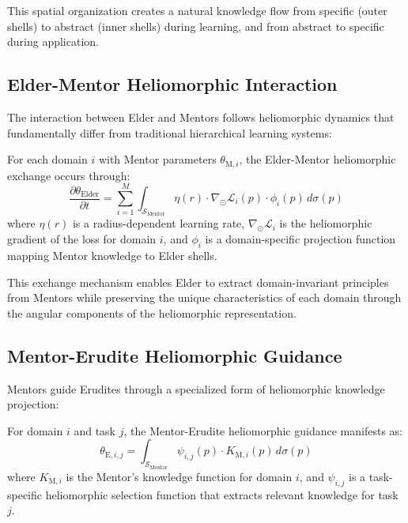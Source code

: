 This spatial organization creates a natural knowledge flow from specific (outer shells) to abstract (inner shells) during learning, and from abstract to specific during application.

\subsection{Elder-Mentor Heliomorphic Interaction}

The interaction between Elder and Mentors follows heliomorphic dynamics that fundamentally differ from traditional hierarchical learning systems:

\begin{proposition}
For each domain $i$ with Mentor parameters $\theta_{\text{M},i}$, the Elder-Mentor heliomorphic exchange occurs through:
\begin{equation}
\frac{\partial \theta_{\text{Elder}}}{\partial t} = \sum_{i=1}^M \int_{\mathcal{S}_{\text{Mentor}}} \eta(r) \cdot \nabla_{\odot} \mathcal{L}_i(p) \cdot \phi_i(p) \, d\sigma(p)
\end{equation}
where $\eta(r)$ is a radius-dependent learning rate, $\nabla_{\odot} \mathcal{L}_i$ is the heliomorphic gradient of the loss for domain $i$, and $\phi_i$ is a domain-specific projection function mapping Mentor knowledge to Elder shells.
\end{proposition}

This exchange mechanism enables Elder to extract domain-invariant principles from Mentors while preserving the unique characteristics of each domain through the angular components of the heliomorphic representation.

\subsection{Mentor-Erudite Heliomorphic Guidance}

Mentors guide Erudites through a specialized form of heliomorphic knowledge projection:

\begin{proposition}
For domain $i$ and task $j$, the Mentor-Erudite heliomorphic guidance manifests as:
\begin{equation}
\theta_{\text{E},i,j} = \int_{\mathcal{S}_{\text{Mentor}}} \psi_{i,j}(p) \cdot K_{\text{M},i}(p) \, d\sigma(p)
\end{equation}
where $K_{\text{M},i}$ is the Mentor's knowledge function for domain $i$, and $\psi_{i,j}$ is a task-specific heliomorphic selection function that extracts relevant knowledge for task $j$.
\end{proposition}

